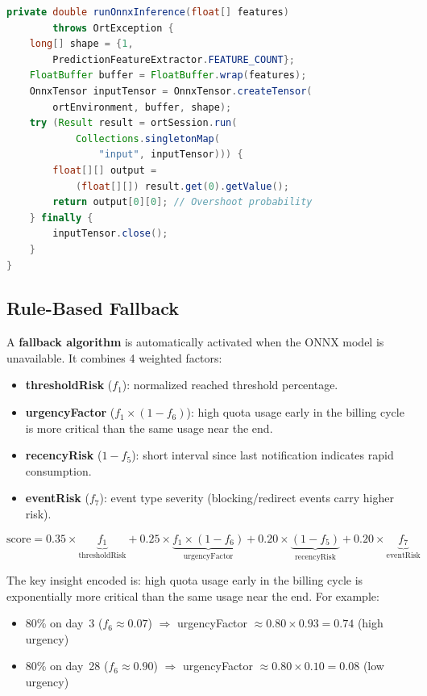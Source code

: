 \begin{lstlisting}[language=Java, caption={ONNX inference in the Flink pipeline}, breaklines=true]
private double runOnnxInference(float[] features)
        throws OrtException {
    long[] shape = {1,
        PredictionFeatureExtractor.FEATURE_COUNT};
    FloatBuffer buffer = FloatBuffer.wrap(features);
    OnnxTensor inputTensor = OnnxTensor.createTensor(
        ortEnvironment, buffer, shape);
    try (Result result = ortSession.run(
            Collections.singletonMap(
                "input", inputTensor))) {
        float[][] output =
            (float[][]) result.get(0).getValue();
        return output[0][0]; // Overshoot probability
    } finally {
        inputTensor.close();
    }
}
\end{lstlisting}

\subsection{Rule-Based Fallback}

A \textbf{fallback algorithm} is automatically activated when the ONNX model is unavailable. It combines 4 weighted factors:
\begin{itemize}
    \item \textbf{thresholdRisk} ($f_1$): normalized reached threshold percentage.
    \item \textbf{urgencyFactor} ($f_1 \times (1 - f_6)$): high quota usage early in the billing cycle is more critical than the same usage near the end.
    \item \textbf{recencyRisk} ($1 - f_5$): short interval since last notification indicates rapid consumption.
    \item \textbf{eventRisk} ($f_7$): event type severity (blocking/redirect events carry higher risk).
\end{itemize}

\begin{equation}
    \label{eq:fallback}
    \text{score} = 0.35 \times \underbrace{f_1}_{\text{thresholdRisk}}
    + 0.25 \times \underbrace{f_1 \times (1 - f_6)}_{\text{urgencyFactor}}
    + 0.20 \times \underbrace{(1 - f_5)}_{\text{recencyRisk}}
    + 0.20 \times \underbrace{f_7}_{\text{eventRisk}}
\end{equation}

The key insight encoded is: high quota usage early in the billing cycle is exponentially more critical than the same usage near the end. For example:
\begin{itemize}
    \item 80\% on day~3 ($f_6 \approx 0.07$) $\Rightarrow$ urgencyFactor $\approx 0.80 \times 0.93 = 0.74$ (high urgency)
    \item 80\% on day~28 ($f_6 \approx 0.90$) $\Rightarrow$ urgencyFactor $\approx 0.80 \times 0.10 = 0.08$ (low urgency)
\end{itemize}

